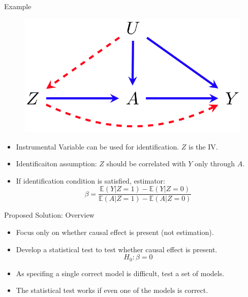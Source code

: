 \documentclass{beamer}
\begin{document}
\begin{frame}{Example}
	\begin{figure}
		\center
		\includegraphics[scale=0.2]{m3.png}
	\end{figure}
	\vspace{1em}
	\begin{itemize}
		\item Instrumental Variable can be used for identification. $ Z $ is the IV.
		\item Identificaiton assumption: $ Z $ should be correlated with $ Y $ only through $ A $.
		\item If identification condition is satisfied, estimator:
			$$ \beta = \frac{\mathbb{E}(Y | Z = 1) - \mathbb{E}(Y | Z = 0)}{\mathbb{E}(A | Z = 1) - \mathbb{E}(A | Z=0)} $$
	\end{itemize}
\end{frame}

\begin{frame}{Proposed Solution: Overview}
	\begin{itemize}
		\item Focus only on whether causal effect is present (not estimation).
		\item Develop a statistical test to test whether causal effect is present. 
			$$ H_0: \beta = 0 $$
		\item As specifing a single correct model is difficult, test a set of models.
		\item The statistical test works if even one of the models is correct.
	\end{itemize}
\end{frame}
\end{document}
